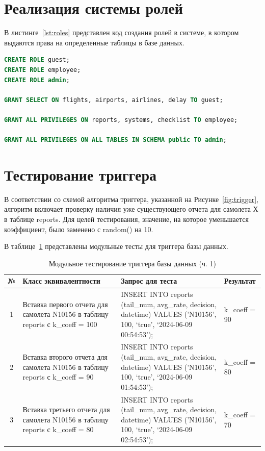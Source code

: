 \section{Реализация системы ролей}

В листинге~\ref{lst:roles} представлен код создания ролей в системе, в котором выдаются права на определенные таблицы в базе данных.

\begin{lstlisting}[label=lst:roles, caption=Создание ролей в системе, language=SQL]
CREATE ROLE guest;
CREATE ROLE employee;
CREATE ROLE admin;

GRANT SELECT ON flights, airports, airlines, delay TO guest;

GRANT ALL PRIVILEGES ON reports, systems, checklist TO employee;

GRANT ALL PRIVILEGES ON ALL TABLES IN SCHEMA public TO admin;
\end{lstlisting}

\newpage
\section{Тестирование триггера}
В соответствии со схемой алгоритма триггера, указанной на Рисунке~\ref{fig:trigger}, алгоритм включает проверку наличия уже существующего отчета для самолета Х в таблице reports.
Для целей тестирования, значение, на которое уменьшается коэффициент, было заменено с random() на 10.

В таблице~\ref{tab:tabl10} представлены модульные тесты для триггера базы данных.
\begin{table}[H]
    \centering
    \captionsetup{justification=raggedright}
    \caption{Модульное тестирование триггера базы данных (ч. 1)}
    \begin{tabular}{|c|p{}|p{}|p{}|}
        \hline
        № & Класс \newline эквивалентности & Запрос для теста & Результат \\
        \hline
        1 & Вставка первого \newline отчета для самолета N10156 в таблицу reports с k\_coeff = 100 & INSERT INTO reports (tail\_num, avg\_rate, decision, datetime) VALUES ('N10156', 100, `true', `2024-06-09 00:54:53'); & k\_coeff = 90 \\
        \hline
        2 & Вставка второго \newline отчета для самолета N10156 в таблицу reports с k\_coeff = 90 & INSERT INTO reports (tail\_num, avg\_rate, decision, datetime) VALUES ('N10156', 100, `true', `2024-06-09 01:54:53'); & k\_coeff = 80 \\
        \hline
        3 & Вставка третьего отчета для самолета N10156 в таблицу reports с k\_coeff = 80 & INSERT INTO reports (tail\_num, avg\_rate, decision, datetime) VALUES ('N10156', 100, `true', `2024-06-09 02:54:53'); & k\_coeff = 70 \\
        \hline
    \end{tabular}
    \label{tab:tabl10}
\end{table}


